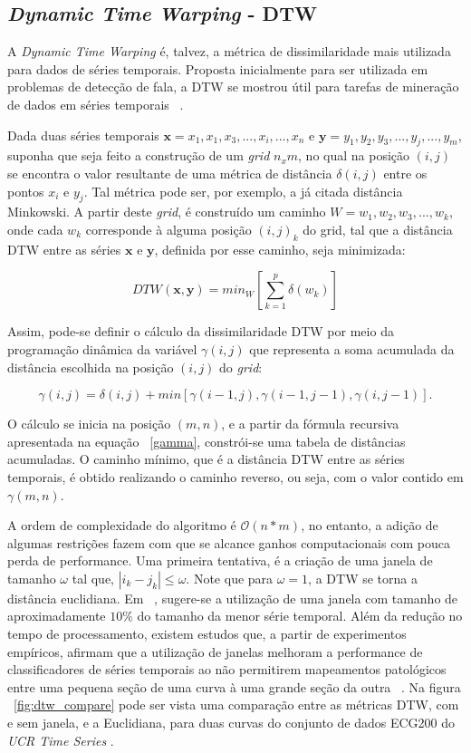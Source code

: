\subsection{\emph{Dynamic Time Warping} - DTW}

A \emph{Dynamic Time Warping} é, talvez, a métrica de dissimilaridade mais utilizada para dados de séries temporais. Proposta inicialmente para ser utilizada em problemas de detecção de fala, a DTW se mostrou útil para tarefas de mineração de dados em séries temporais ~\parencite{DTW}.

Dada duas séries temporais $\bm{x} = x_1,x_1,x_3,...,x_i,...,x_n$ e $\bm{y} = y_1,y_2,y_3,...,y_j,...,y_m$, suponha que seja feito a construção de um \emph{grid} $n_{x}m$, no qual na posição $(i,j)$ se encontra o valor resultante de uma métrica de distância $\delta(i,j)$ entre os pontos $x_i$ e $y_j$. Tal métrica pode ser, por exemplo, a já citada distância Minkowski. A partir deste \emph{grid}, é construído um caminho $W=w_1,w_2,w_3,...,w_k$, onde cada $w_k$ corresponde à alguma posição $(i,j)_k$ do grid, tal que a distância DTW entre as séries $\bm{x}$ e $\bm{y}$, definida por esse caminho, seja minimizada:

\begin{equation}
DTW(\bm{x},\bm{y}) = min_W[\sum_{k=1}^{p}\delta(w_k)]
\end{equation}

Assim, pode-se definir o cálculo da dissimilaridade DTW por meio da programação dinâmica da variável $\gamma(i,j)$ que representa a soma acumulada da distância escolhida na posição $(i,j)$ do \emph{grid}:

\begin{equation} \label{gamma}
\gamma(i,j) = \delta(i,j) + min[\gamma(i-1,j),\gamma(i-1,j-1),\gamma(i,j-1)].
\end{equation}

O cálculo se inicia na posição $(m,n)$, e a partir da fórmula recursiva apresentada na equação ~\ref{gamma}, constrói-se uma tabela de distâncias acumuladas. O caminho mínimo, que é a distância DTW entre as séries temporais, é obtido realizando o caminho reverso, ou seja, com o valor contido em $\gamma(m,n)$.

A ordem de complexidade do algoritmo é $\mathcal{O}(n*m)$, no entanto, a adição de algumas restrições fazem com que se alcance ganhos computacionais com pouca perda de performance. Uma primeira tentativa, é a criação de uma janela de tamanho $\omega$ tal que, $|i_k-j_k| \leq \omega$. Note que para $\omega=1$, a DTW se torna a distância euclidiana. Em ~\parencite{BatistaComparativo}, sugere-se a utilização de uma janela com tamanho de aproximadamente $10\%$ do tamanho da menor série temporal. Além da redução no tempo de processamento, existem estudos que, a partir de experimentos empíricos, afirmam que a utilização de janelas melhoram a performance de classificadores de séries temporais ao não permitirem mapeamentos patológicos entre uma pequena seção de uma curva à uma grande seção da outra ~\parencite{LB_Keogh}. Na figura ~\ref{fig:dtw_compare} pode ser vista uma comparação entre as métricas DTW, com e sem janela, e a Euclidiana, para duas curvas do conjunto de dados ECG200 do \emph{UCR Time Series} \parencite{UCRArchive}.

